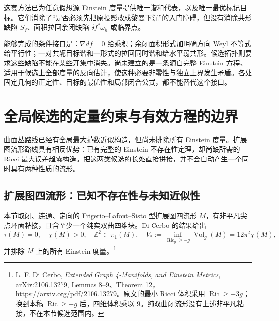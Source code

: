\documentclass[UTF8,fontset=fandol,zihao=-4,oneside,openany]{ctexbook}
\theoremstyle{cjkplain}
\numberwithin{equation}{chapter}
\DeclareMathOperator{\Ric}{Ric}
\DeclareMathOperator{\Vol}{Vol}
\begin{document}
这套方法已为任意假想源 Einstein 度量提供唯一谐和代表，以及唯一最优标记目标。它们消除了“是否必须先把原投影改成黎曼下沉”的入门障碍，但没有消除共形缺陷 $S_f$、面积拉回余闭缺陷 $\delta f^*\omega_h$ 或临界点。

能够完成的条件接口是：$\nabla df=0$ 给乘积；余闭面积形式加明确方向 Weyl 不等式给平行性；一对共轭目标谐和一形式的拉回同时谐和给水平弱共形。候选拓扑则要求这些缺陷不能在某些开集中消失。尚未建立的是一条源自完整 Einstein 方程、适用于候选上全部度量的反向估计，使这种必要非零性与独立上界发生矛盾。各处固定几何的正定性、目标的最优性和局部闭合公式，都不能替代这个接口。


\chapter{全局候选的定量约束与有效方程的边界}\label{GLB:chapter}
曲面丛路线已经有全局最大范数近似构造，但尚未排除所有 Einstein 度量。扩展图流形路线具有相反优势：已有完整的 Einstein 不存在性定理，却尚缺所需的 Ricci 最大误差趋零构造。把这两类候选的长处直接拼接，并不会自动产生一个同时具有两种性质的流形。

\section{扩展图四流形：已知不存在性与未知近似性}
本节取闭、连通、定向的 Frigerio--Lafont--Sisto 型扩展图四流形 $M$，有非平凡尖点环面粘接，且含至少一个纯实双曲四维块。Di Cerbo 的结果给出
\begin{equation}\label{GLB:graphinput}
\tau(M)=0,\quad \chi(M)>0,\quad
\mathbb Z^2\subset\pi_1(M),\quad
V_*:=\inf_{\Ric_g\ge-g}\Vol_g(M)=12\pi^2\chi(M),
\end{equation}
并排除 $M$ 上的所有 Einstein 度量。\footnote{L. F. Di Cerbo, \emph{Extended Graph 4-Manifolds, and Einstein Metrics}, arXiv:2106.13279, Lemmas 8--9、Theorem 12，\url{https://arxiv.org/pdf/2106.13279}。原文的最小 Ricci 体积采用 $\Ric\ge-3g$；换到本稿 $\Ric\ge-g$ 后，四维体积乘以 $9$。纯双曲闭流形没有上述非平凡粘接，不在本节候选范围内。}
\end{document}
